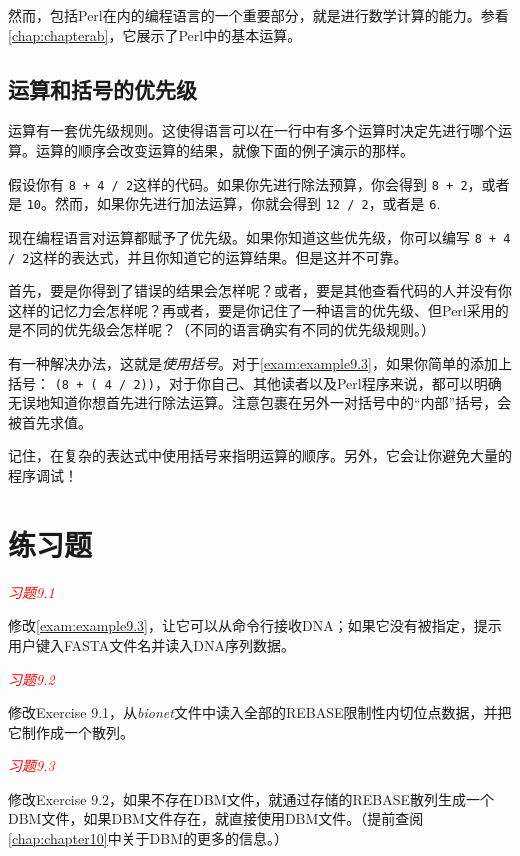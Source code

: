 然而，包括Perl在内的编程语言的一个重要部分，就是进行数学计算的能力。参看\autoref{chap:chapterab}，它展示了Perl中的基本运算。

\subsection{运算和括号的优先级}
\label{sect:section9.3.1}
运算有一套优先级规则。这使得语言可以在一行中有多个运算时决定先进行哪个运算。运算的顺序会改变运算的结果，就像下面的例子演示的那样。

假设你有 \verb|8 + 4 / 2|这样的代码。如果你先进行除法预算，你会得到 \verb|8 + 2|，或者是 \verb|10|。然而，如果你先进行加法运算，你就会得到 \verb|12 / 2|，或者是 \verb|6|.

现在编程语言对运算都赋予了优先级。如果你知道这些优先级，你可以编写 \verb|8 + 4 / 2|这样的表达式，并且你知道它的运算结果。但是这并不可靠。

首先，要是你得到了错误的结果会怎样呢？或者，要是其他查看代码的人并没有你这样的记忆力会怎样呢？再或者，要是你记住了一种语言的优先级、但Perl采用的是不同的优先级会怎样呢？（不同的语言确实有不同的优先级规则。）

有一种解决办法，这就是\textit{使用括号}。对于\autoref{exam:example9.3}，如果你简单的添加上括号： \verb|(8 + ( 4 / 2))|，对于你自己、其他读者以及Perl程序来说，都可以明确无误地知道你想首先进行除法运算。注意包裹在另外一对括号中的“内部”括号，会被首先求值。

记住，在复杂的表达式中使用括号来指明运算的顺序。另外，它会让你避免大量的程序调试！

\section{练习题}
\label{sect:section9.4}
\textcolor{red}{\textit{习题9.1}}
\begin{adjustwidth}{4em}{}
修改\autoref{exam:example9.3}，让它可以从命令行接收DNA；如果它没有被指定，提示用户键入FASTA文件名并读入DNA序列数据。
\end{adjustwidth}

\textcolor{red}{\textit{习题9.2}}
\begin{adjustwidth}{4em}{}
  修改Exercise
  9.1，从\textit{bionet}文件中读入全部的REBASE限制性内切位点数据，并把它制作成一个散列。
\end{adjustwidth}

\textcolor{red}{\textit{习题9.3}}
\begin{adjustwidth}{4em}{}
修改Exercise 9.2，如果不存在DBM文件，就通过存储的REBASE散列生成一个DBM文件，如果DBM文件存在，就直接使用DBM文件。（提前查阅\autoref{chap:chapter10}中关于DBM的更多的信息。）
\end{adjustwidth}

